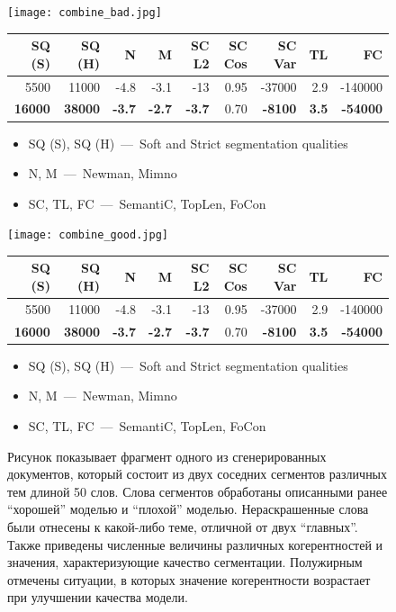 \begin{figure}[h]

    \centering
    \texttt{[image: combine\_bad.jpg]}

  \vspace{-0.5cm}

    \scriptsize
    \centering
    \begin{tabular}{rrrrrrrrr}
      SQ (S) & SQ (H) & N & M & SC L2 & SC Cos & SC Var & TL & FC\\
      \midrule
      \rowcolor{my-blue-light}
      5500 & 11000 & -4.8 & -3.1 & -13 & 0.95 & -37000 & 2.9 & -140000\\
      \textbf{16000} & \textbf{38000} & \textbf{-3.7} & \textbf{-2.7} & \textbf{-3.7} & 0.70 & \textbf{-8100} & \textbf{3.5} & \textbf{-54000}
    \end{tabular}

  \begin{itemize}\setlength{\itemindent}{0pt}
    \small
    \item SQ (S), SQ (H)~---~Soft and Strict segmentation qualities
    \item N, M~---~Newman, Mimno
    \item SC, TL, FC~---~SemantiC, TopLen, FoCon
  \end{itemize}

    \centering
    \texttt{[image: combine\_good.jpg]}

  \vspace{-0.5cm}

    \scriptsize
    \centering
    \begin{tabular}{rrrrrrrrr}
      SQ (S) & SQ (H) & N & M & SC L2 & SC Cos & SC Var & TL & FC\\
      \midrule
      5500 & 11000 & -4.8 & -3.1 & -13 & 0.95 & -37000 & 2.9 & -140000\\
      \rowcolor{my-blue-light}
      \textbf{16000} & \textbf{38000} & \textbf{-3.7} & \textbf{-2.7} & \textbf{-3.7} & 0.70 & \textbf{-8100} & \textbf{3.5} & \textbf{-54000}
    \end{tabular}

  \begin{itemize}\setlength{\itemindent}{0pt}
    \small
    \item SQ (S), SQ (H)~---~Soft and Strict segmentation qualities
    \item N, M~---~Newman, Mimno
    \item SC, TL, FC~---~SemantiC, TopLen, FoCon
  \end{itemize}

    \label{fig:segm_good_bad}
    \caption{Рисунок показывает фрагмент одного из сгенерированных документов, который состоит из двух соседних сегментов различных тем длиной 50 слов. Слова сегментов обработаны описанными ранее ``хорошей'' моделью и ``плохой'' моделью. Нераскрашенные слова были отнесены к какой-либо теме, отличной от двух ``главных''. Также приведены численные величины различных когерентностей и значения, характеризующие качество сегментации. Полужирным отмечены ситуации, в которых значение когерентности возрастает при улучшении качества модели.}
\end{figure}




